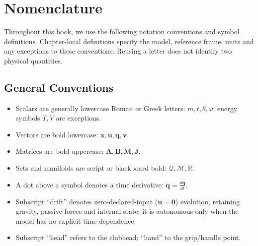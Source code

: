 \chapter*{Nomenclature}

Throughout this book, we use the following notation conventions and symbol definitions.
Chapter-local definitions specify the model, reference frame, units and any
exceptions to these conventions. Reusing a letter does not identify two physical quantities.

\section*{General Conventions}
\begin{itemize}
    \item Scalars are generally lowercase Roman or Greek letters: $m, t, \theta, \omega$; energy symbols $T,V$ are exceptions.
    \item Vectors are bold lowercase: $\bm{x}, \bm{u}, \bm{q}, \bm{v}$.
    \item Matrices are bold uppercase: $\bm{A}, \bm{B}, \bm{M}, \bm{J}$.
    \item Sets and manifolds are script or blackboard bold: $\mathcal{Q}, \mathcal{M}, \mathbb{R}$.
    \item A dot above a symbol denotes a time derivative: $\dot{\bm{q}} = \frac{\dd \bm{q}}{\dd t}$.
    \item Subscript ``drift'' denotes zero-declared-input ($\bm{u}=\bm{0}$) evolution, retaining gravity, passive forces and internal state; it is autonomous only when the model has no explicit time dependence.
    \item Subscript ``head'' refers to the clubhead; ``hand'' to the grip/handle point.
\end{itemize}

